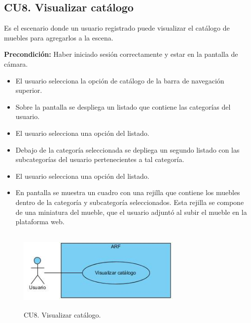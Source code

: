 \subsection{CU8. Visualizar catálogo}\par
Es el escenario donde un usuario registrado puede visualizar el catálogo de muebles para agregarlos a la escena.\par
\textbf{Precondición:} Haber iniciado sesión correctamente y estar en la pantalla de cámara.\par
\begin{itemize}
	\item El usuario selecciona la opción de catálogo de la barra de navegación superior.
	\item Sobre la pantalla se despliega un listado que contiene las categorías del usuario.
	\item El usuario selecciona una opción del listado.
	\item Debajo de la categoría seleccionada se depliega un segundo listado con las subcategorías del usuario pertenecientes a tal categoría.
	\item El usuario selecciona una opción del listado.
	\item En pantalla se muestra un cuadro con una rejilla que contiene los muebles dentro de la categoría y subcategoría seleccionados. Esta rejilla se compone de una miniatura del mueble, que el usuario adjuntó al subir el mueble en la plataforma web.
\end{itemize}

\begin{figure}[!htbp]
	\centering
	\includegraphics[width=8cm,height=4cm]{imagenes/analisis/cu/visualizar_catalogo.jpg}
	\caption{CU8. Visualizar catálogo.}
	\label{fig:visualizarcatalogo}
\end{figure} 

